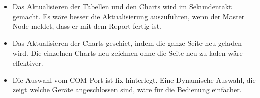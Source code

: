 \begin{itemize}
	\item Das Aktualisieren der Tabellen und den Charts wird im Sekundentakt gemacht. Es wäre besser die Aktualisierung auszuführen, wenn der Master Node meldet, dass er mit dem Report fertig ist.
	\item Das Aktualisieren der Charts geschiet, indem die ganze Seite neu geladen wird. Die einzelnen Charts neu zeichnen ohne die Seite neu zu laden wäre effektiver.
	\item Die Auswahl vom COM-Port ist fix hinterlegt. Eine Dynamische Auswahl, die zeigt welche Geräte angeschlossen sind, wäre für die Bedienung einfacher.
\end{itemize}


